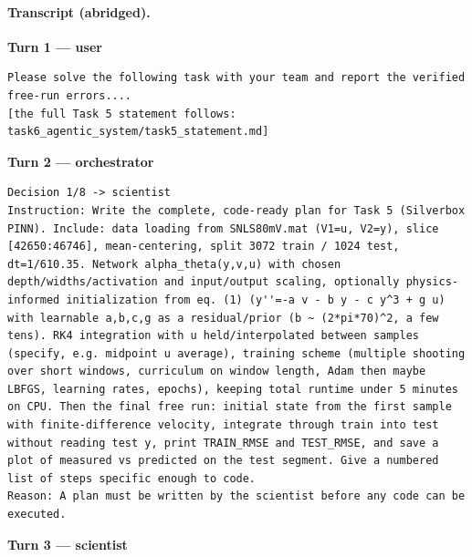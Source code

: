 \paragraph{Transcript (abridged).}
\noindent\textbf{Turn 1 --- user}
\begin{lstlisting}
Please solve the following task with your team and report the verified free-run errors....
[the full Task 5 statement follows: task6_agentic_system/task5_statement.md]
\end{lstlisting}
\noindent\textbf{Turn 2 --- orchestrator}
\begin{lstlisting}
Decision 1/8 -> scientist
Instruction: Write the complete, code-ready plan for Task 5 (Silverbox PINN). Include: data loading from SNLS80mV.mat (V1=u, V2=y), slice [42650:46746], mean-centering, split 3072 train / 1024 test, dt=1/610.35. Network alpha_theta(y,v,u) with chosen depth/widths/activation and input/output scaling, optionally physics-informed initialization from eq. (1) (y''=-a v - b y - c y^3 + g u) with learnable a,b,c,g as a residual/prior (b ~ (2*pi*70)^2, a few tens). RK4 integration with u held/interpolated between samples (specify, e.g. midpoint u average), training scheme (multiple shooting over short windows, curriculum on window length, Adam then maybe LBFGS, learning rates, epochs), keeping total runtime under 5 minutes on CPU. Then the final free run: initial state from the first sample with finite-difference velocity, integrate through train into test without reading test y, print TRAIN_RMSE and TEST_RMSE, and save a plot of measured vs predicted on the test segment. Give a numbered list of steps specific enough to code.
Reason: A plan must be written by the scientist before any code can be executed.
\end{lstlisting}
\noindent\textbf{Turn 3 --- scientist}

